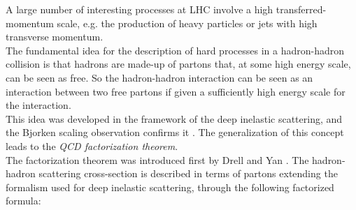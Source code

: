 A large number of interesting processes at LHC involve a high transferred-momentum scale, e.g. the production of heavy particles or jets with high transverse momentum. 
\\
The fundamental idea for the description of hard processes in a hadron-hadron collision is that hadrons are made-up of partons that, at some high energy scale, can be seen as free. So the hadron-hadron interaction can be seen as an interaction between two free partons if given a sufficiently high energy scale for the interaction.
\\
This idea was developed in the framework of the deep inelastic scattering, and the Bjorken scaling observation confirms it \cite{Bjorken:1968dy}. The generalization of this concept leads to the \textit{QCD factorization theorem}. 
\\   
The factorization theorem was introduced first by Drell and Yan \cite{DRELL1971578}. 
The hadron-hadron scattering cross-section is described in terms of partons extending the formalism used for deep inelastic scattering, through the following factorized formula:

